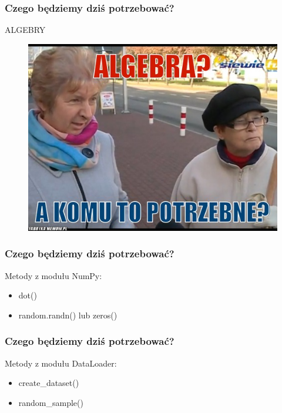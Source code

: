 \documentclass[16pt]{beamer}
\begin{document}
\begin{frame}
\frametitle{Czego będziemy dziś potrzebować?}
\begin{center}
ALGEBRY
\end{center}
\begin{figure}[ht]
\includegraphics[scale=0.5]{./algebra.jpg}
\end{figure}
\end{frame}

\begin{frame}
\frametitle{Czego będziemy dziś potrzebować?}
\begin{center}
Metody z modułu NumPy:
\begin{itemize}
	\item dot()
	\item random.randn() lub zeros()
\end{itemize}
\end{center}
\end{frame}

\begin{frame}
\frametitle{Czego będziemy dziś potrzebować?}
\begin{center}
Metody z modułu DataLoader:
\begin{itemize}
\item create\_dataset()
\item random\_sample()
\end{itemize}
\end{center}
\end{frame}
\end{document}
